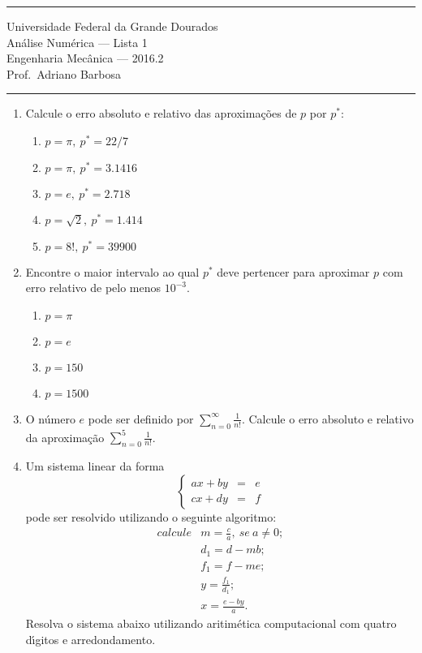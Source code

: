\documentclass{article}
\newcommand{\ds}{\displaystyle}
\begin{document}
\noindent{}\rule{\textwidth}{0.4pt}
\begin{center}
	Universidade Federal da Grande Dourados\\
	An\'alise Num\'erica --- Lista 1 \\
	Engenharia Mec\^anica --- 2016.2 \\
	Prof.\ Adriano Barbosa
\end{center}
\noindent{}\rule{\textwidth}{0.4pt}

\begin{enumerate}
	\item Calcule o erro absoluto e relativo das aproxima\c{c}\~oes de $p$ por $p^*$:
		\begin{enumerate}
			\item $p = \pi,\ p^*  = 22/7$
			\item $p = \pi,\ p^* = 3.1416$
			\item $p = e,\ p^* = 2.718$
			\item $p = \sqrt{2},\ p^* = 1.414$
			\item $p = 8!,\ p^* = 39900$
		\end{enumerate}
	
	\item Encontre o maior intervalo ao qual $p^*$ deve pertencer para
		aproximar $p$ com erro relativo de pelo menos $10^{-3}$.
		\begin{enumerate}
			\item $p = \pi$
			\item $p = e$
			\item $p = 150$
			\item $p = 1500$
		\end{enumerate}
	
	\item O n\'umero $e$ pode ser definido por $\ds\sum_{n=0}^\infty
		\frac{1}{n!}$.  Calcule o erro absoluto e relativo da aproxima\c{c}\~ao
		$\ds\sum_{n=0}^5 \frac{1}{n!}$.

	\item Um sistema linear da forma
		\[\left\{\begin{array}{lcl}
			ax + by & = & e \\
			cx + dy & = & f
		\end{array}\right.\]
		pode ser resolvido utilizando o seguinte algoritmo:
		\[\begin{array}{ll}
		calcule & m = \ds\frac{c}{a},\ se\ a \neq{} 0; \\
				& d_1 = d - mb; \\
				& f_1 = f - me; \\
				& y = \ds\frac{f_1}{d_1}; \\
				& x = \ds\frac{e - by}{a}.
		\end{array}\]
		Resolva o sistema abaixo utilizando aritim\'etica computacional com
		quatro d\'{\i}gitos e arredondamento.


\end{enumerate}
\end{document}
